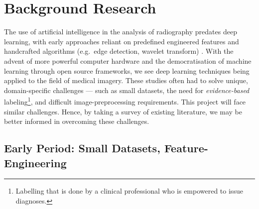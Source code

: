 \chapter{Background Research}\label{background}



The use of artificial intelligence in the analysis of radiography predates deep learning, with early approaches reliant on predefined engineered features and handcrafted algorithms (e.g.\ edge detection, wavelet transform) \autocite{Hosny2018}. With the advent of more powerful computer hardware and the democratisation of machine learning through open source frameworks, we see deep learning techniques being applied to the field of medical imagery. These studies often had to solve unique, domain-specific challenges --- such as small datasets, the need for \emph{evidence-based} labeling\footnote{Labelling that is done by a clinical professional who is empowered to issue diagnoses.}, and difficult image-preprocessing requirements. This project will face similar challenges. Hence, by taking a survey of existing literature, we may be better informed in overcoming these challenges. 

\section{Early Period: Small Datasets, Feature-Engineering}



